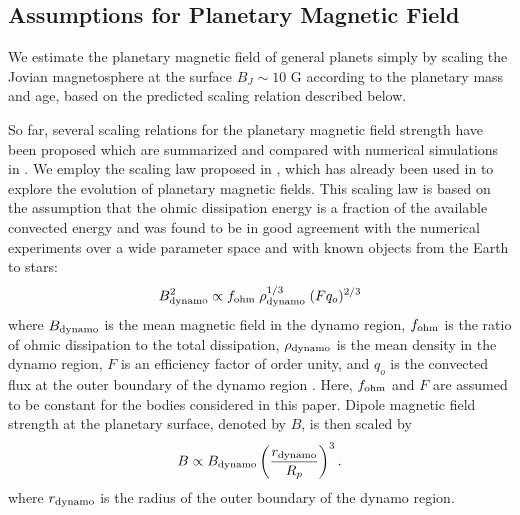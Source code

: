 \documentclass[iop,numberedappendix,apj]{emulateapj}
\def\memoYF#1{\color{red}$[${\bf #1}$]$ \color{black}}
\begin{document}
\subsection{Assumptions for Planetary Magnetic Field}
\label{ss:magneticfield}

We estimate the planetary magnetic field of general planets  
simply by scaling the Jovian magnetosphere at the surface $B_J \sim 10$ G according to the planetary mass and age, based on the predicted scaling relation described below. 

So far, several scaling relations for the planetary magnetic field strength  
have been proposed \citep[e.g.][]{russel1978,busse1976,stevenson1979,mizutani1992,sano1993,starchenko2002,christensen2006,christensen_et_al2009} %
which are summarized and compared with numerical simulations in \citet{christensen2010}. 
We employ the scaling law proposed in \citet{christensen_et_al2009}, which has already been used in \citet{reiners2010} to explore the evolution of planetary magnetic fields.
This scaling law is based on the assumption that the ohmic dissipation energy is a fraction of the available convected energy and was found to be in good agreement with the numerical experiments over a wide parameter space and with known objects from the Earth to stars: 
\begin{equation}
B_{\rm dynamo} ^2 \propto f_{\rm ohm}\;\rho_{\rm dynamo}^{1/3} \;  (Fq_o)^{2/3} \label{eq:Bscaling} 
\end{equation}
where $B_{\rm dynamo}$ is the mean magnetic field in the dynamo region, $f_{\rm ohm}$ is the ratio of ohmic dissipation to the total dissipation, $\rho_{\rm dynamo} $ is the mean density in the dynamo region, $F$ is an efficiency factor of order unity, and $q_o$ is the convected flux at the outer boundary of the dynamo region \citep[see][for the comprehensive description]{christensen_et_al2009}. 
Here, $f_{\rm ohm}$ and $F$ are assumed to be constant for the bodies considered in this paper. 
Dipole magnetic field strength at the planetary surface, denoted by $B$, is then scaled by
\begin{equation}
B \propto B_{\rm dynamo} \left( \frac{r_{\rm dynamo}}{R_p} \right)^3.  \label{eq:Bscaling2}
\end{equation}
where $r_{\rm dynamo}$ is the radius of the outer boundary of the dynamo region. 
\end{document}
